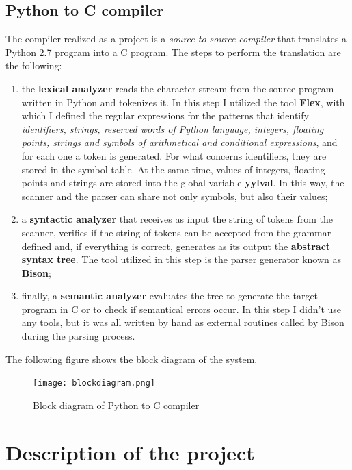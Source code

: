 \documentclass[a4paper,12pt,,titlepage,openright]{report}
\begin{document}
\section{Python to C compiler}
The compiler realized as a project is a \textit{source-to-source compiler} that translates a Python 2.7 program into a C program.
The steps to perform the translation are the following:
\begin{enumerate}
\item the \textbf{lexical analyzer} reads the character stream from the source program written in Python and tokenizes it. In this step I utilized the tool \textbf{Flex}, with which I defined the regular expressions for the patterns that identify \textit{identifiers, strings, reserved words of Python language, integers, floating points, strings and symbols of arithmetical and conditional expressions}, and for each one a token is generated.
For what concerns identifiers, they are stored  in the symbol table. At the same time, values of integers, floating points and strings are stored into the global variable \textbf{yylval}. In this way, the scanner and the parser can share not only symbols, but also their values;
\item a \textbf{syntactic analyzer} that receives as input the string of tokens from the scanner, verifies if the string of tokens can be accepted from the grammar defined and, if everything is correct, generates as its output the \textbf{abstract syntax tree}. The tool utilized in this step is the parser generator known as \textbf{Bison};
\item finally, a \textbf{semantic analyzer} evaluates the tree to generate the target program in C or to check if semantical errors occur. In this step I didn't use any tools, but it was all written by hand as external routines called by Bison during the parsing process.
\end{enumerate}
The following figure shows the block diagram of the system.
\begin{figure}[htbp]
\centering
\texttt{[image: blockdiagram.png]}
\caption{Block diagram of Python to C compiler}
\end{figure}

\chapter{Description of the project}
\end{document}
